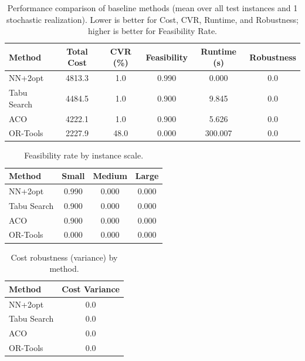 

\begin{table}[ht]
\centering
\caption{Performance comparison of baseline methods (mean over all test
instances and 1 stochastic realization). Lower is better for Cost, CVR,
Runtime, and Robustness; higher is better for Feasibility Rate.}
\label{tab:main_results}
\begin{tabular}{lccccc}
\toprule
\textbf{Method} & \textbf{Total Cost} & \textbf{CVR (\%)} &
\textbf{Feasibility} & \textbf{Runtime (s)} & \textbf{Robustness} \\
\midrule
NN+2opt & 4813.3 & 1.0 & 0.990 & 0.000 & 0.0 \\
Tabu Search & 4484.5 & 1.0 & 0.900 & 9.845 & 0.0 \\
ACO & 4222.1 & 1.0 & 0.900 & 5.626 & 0.0 \\
OR-Tools & 2227.9 & 48.0 & 0.000 & 300.007 & 0.0 \\
\bottomrule
\end{tabular}
\end{table}

\begin{table}[ht]
\centering
\caption{Feasibility rate by instance scale.}
\label{tab:feasibility_by_scale}
\begin{tabular}{lccc}
\toprule
\textbf{Method} & \textbf{Small} & \textbf{Medium} & \textbf{Large} \\
\midrule
NN+2opt & 0.990 & 0.000 & 0.000 \\
Tabu Search & 0.900 & 0.000 & 0.000 \\
ACO & 0.900 & 0.000 & 0.000 \\
OR-Tools & 0.000 & 0.000 & 0.000 \\
\bottomrule
\end{tabular}
\end{table}

\begin{table}[ht]
\centering
\caption{Cost robustness (variance) by method.}
\label{tab:robustness_variance}
\begin{tabular}{lc}
\toprule
\textbf{Method} & \textbf{Cost Variance} \\
\midrule
NN+2opt & 0.0 \\
Tabu Search & 0.0 \\
ACO & 0.0 \\
OR-Tools & 0.0 \\
\bottomrule
\end{tabular}
\end{table}

